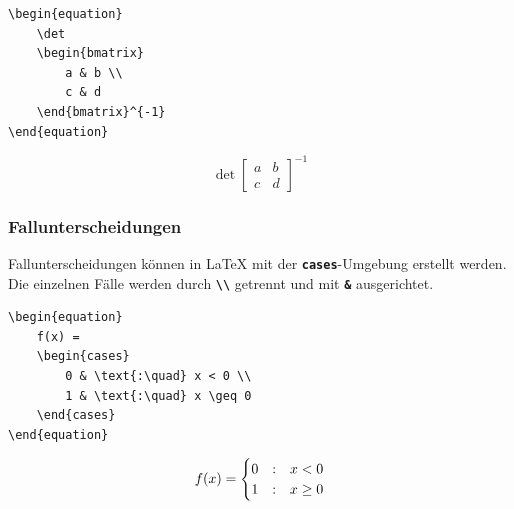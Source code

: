 \begin{minipage}{0.5\textwidth}
    \begin{lstlisting}[language={[LaTeX]TeX}]
\begin{equation}
    \det
    \begin{bmatrix}
        a & b \\
        c & d
    \end{bmatrix}^{-1}
\end{equation}
\end{lstlisting}
\end{minipage}
\hfill
\begin{minipage}{0.5\textwidth}
    \begin{equation}
        \det
        \begin{bmatrix}
            a & b \\
            c & d
        \end{bmatrix}^{-1}
    \end{equation}
\end{minipage}



\subsubsection{Fallunterscheidungen}
Fallunterscheidungen können in \LaTeX{} mit der \textbf{\texttt{cases}}-Umgebung erstellt werden. Die einzelnen Fälle werden durch \textbf{\texttt{\textbackslash\textbackslash}} getrennt und mit \textbf{\texttt{\&}} ausgerichtet.

\begin{minipage}{0.5\textwidth}
    \begin{lstlisting}[language={[LaTeX]TeX}]
\begin{equation}
    f(x) =
    \begin{cases}
        0 & \text{:\quad} x < 0 \\
        1 & \text{:\quad} x \geq 0
    \end{cases}
\end{equation}
\end{lstlisting}
\end{minipage}
\hfill
\begin{minipage}{0.5\textwidth}
    \begin{equation}
        f(x) =
        \begin{cases}
            0 & \text{:\quad} x < 0    \\
            1 & \text{:\quad} x \geq 0
        \end{cases}
    \end{equation}
\end{minipage}

